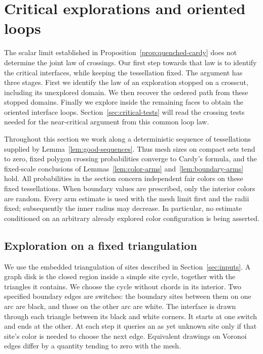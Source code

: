 \section{Critical explorations and oriented loops}
\label{sec:critical}

The scalar limit established in Proposition~\ref{prop:quenched-cardy}
does not determine the joint law of crossings.  Our first step towards
that law is to identify the critical interfaces, while keeping the
tessellation fixed.  The argument has three stages.  First we identify
the law of an exploration stopped on a crosscut, including its unexplored
domain.  We then recover the ordered path from these stopped domains.
Finally we explore inside the remaining faces to obtain the oriented
interface loops.  Section~\ref{sec:critical-tests} will read the crossing
tests needed for the near-critical argument from this common loop law.

Throughout this section we work along a deterministic sequence of
tessellations supplied by Lemma~\ref{lem:good-sequences}.  Thus mesh
sizes on compact sets tend to zero, fixed polygon crossing probabilities
converge to Cardy's formula, and the fixed-scale conclusions of
Lemmas~\ref{lem:color-arms} and~\ref{lem:boundary-arms} hold.  All
probabilities in the section concern independent fair colors on these
fixed tessellations.  When boundary values are prescribed, only the
interior colors are random.  Every arm estimate is used with the mesh
limit first and the radii fixed; subsequently the inner radius may
decrease.  In particular, no estimate conditioned on an arbitrary
already explored color configuration is being asserted.

\subsection{Exploration on a fixed triangulation}

We use the embedded triangulation of sites described in
Section~\ref{sec:inputs}.  A graph disk is the closed region inside a
simple site cycle, together with the triangles it contains.  We choose
the cycle without chords in its interior.  Two specified boundary edges
are switches: the boundary sites between them on one arc are black, and
those on the other arc are white.  The interface is drawn through each
triangle between its black and white corners.  It starts at one switch
and ends at the other.  At each step it queries an as yet unknown site
only if that site's color is needed to choose the next edge.  Equivalent
drawings on Voronoi edges differ by a quantity tending to zero with the
mesh.


